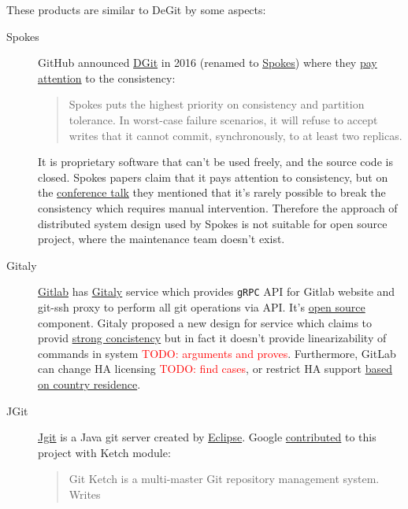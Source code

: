 \documentclass[acmlarge, screen, nonacm, 11pt]{acmart}
\newcommand{\code}[1]{\texttt{#1}}
\newcommand{\todo}[1]{\textcolor{red}{TODO: #1}}
\begin{document}
\begin{itemize}
These products are similar to DeGit by some aspects:
\begin{description}
  \item[Spokes]
    GitHub announced \href{https://github.blog/2016-04-05-introducing-dgit/}{DGit}
    in 2016 (renamed to \href{https://github.blog/2016-09-07-building-resilience-in-spokes/}{Spokes})
    where they \href{https://github.blog/2016-09-07-building-resilience-in-spokes/#defining-resilience}{pay attention}
    to the consistency:
    \begin{quote}
      Spokes puts the highest priority on consistency and partition tolerance.
      In worst-case failure scenarios, it will refuse to accept writes that it cannot commit,
      synchronously, to at least two replicas.
    \end{quote}
     It is proprietary software that can't be used freely, and the source code is closed.
    Spokes papers claim that it pays attention to consistency, but on the
    \href{https://www.youtube.com/watch?v=DY0yNRNkYb0}{conference talk} they mentioned that
    it's rarely possible to break the consistency which requires manual intervention.
    Therefore the approach of distributed system design used by Spokes is not suitable for open
    source project, where the maintenance team doesn't exist.
  \item[Gitaly]
    \href{https://docs.gitlab.com/ee/README.html}{Gitlab} has
    \href{https://docs.gitlab.com/ee/administration/gitaly/}{Gitaly} service which provides
    \code{gRPC} API for Gitlab website and git-ssh proxy to perform all git operations via API.
    It's \href{https://gitlab.com/gitlab-org/gitaly}{open source} component.
    Gitaly proposed a new design for service which claims to provid
    \href{https://gitlab.com/gitlab-org/gitaly/-/blob/master/doc/design\_ha.md\#strong-consistency-design}{strong concistency}
    but in fact it doesn't provide linearizability of commands in system \todo{arguments and proves}.
    Furthermore, GitLab can change HA licensing \todo{find cases},
    or restrict HA support \href{https://news.ycombinator.com/item?id=21437334}{based on country residence}.
  \item[JGit]
    \href{https://www.eclipse.org/jgit/}{Jgit} is a Java git server created by \href{https://www.eclipse.org/}{Eclipse}.
    Google \href{https://www.eclipse.org//lists/jgit-dev/msg03073.html}{contributed} to this project with Ketch module:
    \begin{quote}
      Git Ketch is a multi-master Git repository management system. Writes

\end{quote}
\end{description}
\end{itemize}
\end{document}
